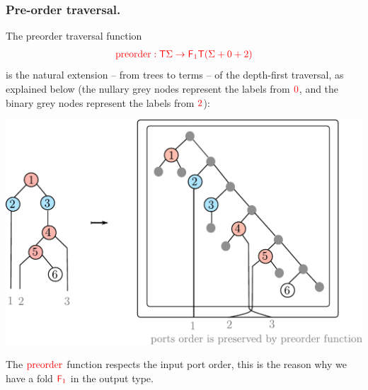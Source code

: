         \subsubsection{Pre-order traversal.} The preorder traversal function  
        \begin{align*}
            {\color{red}{{\color{red}{\mathrm{preorder}}}: {\color{red}{\mathsf T}}\Sigma \to {\color{red}{\mathsf F_{1}}}{\color{red}{\mathsf T}}({\color{red}{\Sigma}}+ 0 + 2)}}
        \end{align*}
        is the natural extension -- from trees to terms -- of the depth-first traversal, as explained below (the nullary grey nodes represent the labels from ${\color{red}{0}}$, and the binary grey nodes represent the labels from ${\color{red}{2}}$):
        \begin{center}
        \includegraphics[scale=.34]{preorder.pdf}
        \end{center}
The ${\color{red}{\mathrm{preorder}}}$ function respects the input port order, this is the reason  why we have a fold $\reduce 1$ in the output type. 




